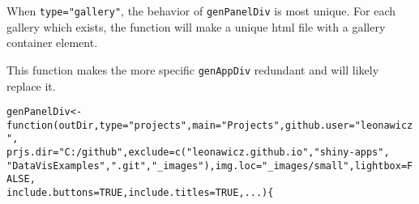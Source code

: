 \documentclass{article}\usepackage[]{graphicx}\usepackage[]{color}
\makeatletter
\newcommand{\hlnum}[1]{\textcolor[rgb]{0.863,0.196,0.184}{#1}}%
\newcommand{\hlstr}[1]{\textcolor[rgb]{0.863,0.196,0.184}{#1}}%
\newcommand{\hlstd}[1]{\textcolor[rgb]{0.514,0.58,0.588}{#1}}%
\newcommand{\hlkwa}[1]{\textcolor[rgb]{0.796,0.294,0.086}{#1}}%
\newcommand{\hlkwb}[1]{\textcolor[rgb]{0.522,0.6,0}{#1}}%
\newcommand{\hlkwc}[1]{\textcolor[rgb]{0.796,0.294,0.086}{#1}}%
\newcommand{\hlkwd}[1]{\textcolor[rgb]{0.576,0.631,0.631}{#1}}%
\newenvironment{kframe}{%
 \def\at@end@of@kframe{}%
 \ifinner\ifhmode%
  \def\at@end@of@kframe{\end{minipage}}%
  \begin{minipage}{\columnwidth}%
 \fi\fi%
 \def\FrameCommand##1{\hskip\@totalleftmargin \hskip-\fboxsep
 \colorbox{shadecolor}{##1}\hskip-\fboxsep
     \hskip-\linewidth \hskip-\@totalleftmargin \hskip\columnwidth}%
 \MakeFramed {\advance\hsize-\width
   \@totalleftmargin\z@ \linewidth\hsize
   \@setminipage}}%
 {\par\unskip\endMakeFramed%
 \at@end@of@kframe}
\newenvironment{knitrout}{}{} %
\makeatother
\begin{document}
When \texttt{type="gallery"}, the behavior of \texttt{genPanelDiv} is most unique.
For each gallery which exists, the function will make a unique html file with a gallery container element.

This function makes the more specific \texttt{genAppDiv} redundant and will likely replace it.

\begin{knitrout}
\color{fgcolor}\begin{kframe}
\begin{alltt}
\hlstd{genPanelDiv} \hlkwb{<-} \hlkwa{function}\hlstd{(}\hlkwc{outDir}\hlstd{,} \hlkwc{type} \hlstd{=} \hlstr{"projects"}\hlstd{,} \hlkwc{main} \hlstd{=} \hlstr{"Projects"}\hlstd{,} \hlkwc{github.user} \hlstd{=} \hlstr{"leonawicz"}\hlstd{,}
    \hlkwc{prjs.dir} \hlstd{=} \hlstr{"C:/github"}\hlstd{,} \hlkwc{exclude} \hlstd{=} \hlkwd{c}\hlstd{(}\hlstr{"leonawicz.github.io"}\hlstd{,} \hlstr{"shiny-apps"}\hlstd{,}
        \hlstr{"DataVisExamples"}\hlstd{,} \hlstr{".git"}\hlstd{,} \hlstr{"_images"}\hlstd{),} \hlkwc{img.loc} \hlstd{=} \hlstr{"_images/small"}\hlstd{,} \hlkwc{lightbox} \hlstd{=} \hlnum{FALSE}\hlstd{,}
    \hlkwc{include.buttons} \hlstd{=} \hlnum{TRUE}\hlstd{,} \hlkwc{include.titles} \hlstd{=} \hlnum{TRUE}\hlstd{,} \hlkwc{...}\hlstd{) \{}


\end{alltt}
\end{kframe}
\end{knitrout}
\end{document}
